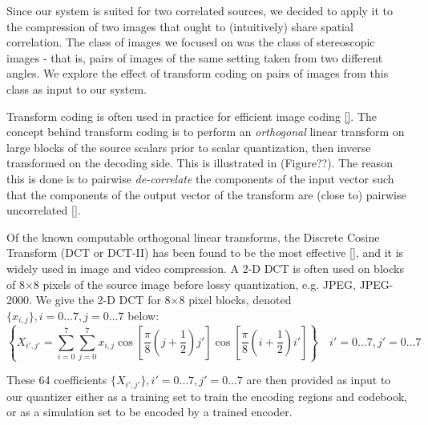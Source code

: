 Since our system is suited for two correlated sources, we decided to apply it to the compression of two images that ought to (intuitively) share spatial correlation. The class of images we focused on was the class of stereoscopic images - that is, pairs of images of the same setting taken from two different angles. We explore the effect of transform coding on pairs of images from this class as input to our system.

Transform coding is often used in practice for efficient image coding \ref{}. The concept behind transform coding is to perform an \emph{orthogonal} linear transform on large blocks of the source scalars prior to scalar quantization, then inverse transformed on the decoding side. This is illustrated in (Figure??). The reason this is done is to pairwise \emph{de-correlate} the components of the input vector such that the components of the output vector of the transform are (close to) pairwise uncorrelated \ref{}.

Of the known computable orthogonal linear transforms, the Discrete Cosine Transform (DCT or DCT-II) has been found to be the most effective \ref{}, and it is widely used in image and video compression. A 2-D DCT is often used on blocks of 8$\times$8 pixels of the source image before lossy quantization, e.g. JPEG, JPEG-2000. We give the 2-D DCT for 8$\times$8 pixel blocks, denoted $\{x_{i,j}\}, i=0\ldots 7, j=0\ldots 7$ below:
\begin{equation}
    \left\{X_{i', j'}=\sum_{i=0}^7\sum_{j=0}^7
        x_{i,j}
            \cos\left[
                \frac{\pi}{8}\left(j+\frac{1}{2}\right)j'
            \right]
            \cos\left[
            \frac{\pi}{8}\left(i + \frac{1}{2}\right)i'
            \right]\right\}\quad i'=0\ldots 7, j'=0\ldots 7
\end{equation}

These 64 coefficients $\{X_{i',j'}\}, i'=0\ldots 7, j'=0\ldots 7$ are then provided as input to our quantizer either as a training set to train the encoding regions and codebook, or as a simulation set to be encoded by a trained encoder.

